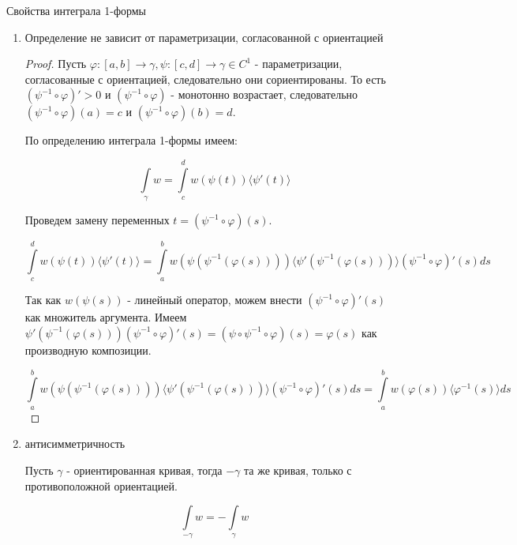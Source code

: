 \documentclass[a5paper]{article}
\theoremstyle{plain}
\theoremstyle{definition}
\numberwithin{through}{section}
\numberwithin{equation}{section}
\begin{document}
Свойства интеграла 1-формы

\begin{enumerate}
	\item Определение не зависит от параметризации, согласованной с ориентацией
	
	\begin{proof}
		Пусть $\varphi : [a, b] \to \gamma, \psi : [c, d] \to \gamma \in C^1$ - параметризации, согласованные с ориентацией, следовательно они сориентированы. То есть  $(\psi^{-1} \circ \varphi)' > 0$ и $(\psi^{-1} \circ \varphi)$ - монотонно возрастает, следовательно $(\psi^{-1} \circ \varphi)(a) = c$ и $(\psi^{-1} \circ \varphi)(b) = d$.
		
		По определению интеграла 1-формы имеем:
		
		\begin{equation*}
			\int\limits_{\gamma} w = \int\limits_{c}^{d} w(\psi(t)) \langle \psi'(t) \rangle 
		\end{equation*}
		
		Проведем замену переменных $t = (\psi^{-1} \circ \varphi)(s)$.
		
		\begin{equation*}
			\int\limits_{c}^{d} w(\psi(t)) \langle \psi'(t) \rangle = \int\limits_{a}^{b} w(\psi(\psi^{-1}(\varphi(s)))) \langle \psi'(\psi^{-1}(\varphi(s))) \rangle (\psi^{-1} \circ \varphi)'(s) ds
		\end{equation*}
		
		Так как $w(\psi(s))$ - линейный оператор, можем внести $(\psi^{-1} \circ \varphi)'(s)$ как множитель аргумента. Имеем $\psi'(\psi^{-1}(\varphi(s)))(\psi^{-1} \circ \varphi)'(s) = (\psi \circ \psi^{-1} \circ \varphi)(s)= \varphi(s)$ как производную композиции.
		
		\begin{equation*}
			 \int\limits_{a}^{b} w(\psi(\psi^{-1}(\varphi(s)))) \langle \psi'(\psi^{-1}(\varphi(s))) \rangle (\psi^{-1} \circ \varphi)'(s) ds = \int\limits_{a}^{b} w(\varphi(s)) \langle \varphi^{-1}(s) \rangle ds
		\end{equation*} 
	\end{proof}

	\item антисимметричность
	
	Пусть $\gamma$ - ориентированная кривая, тогда $-\gamma$ та же кривая, только с противоположной ориентацией. 
	
	\begin{equation*}
		\int\limits_{-\gamma} w = -\int\limits_{\gamma} w
	\end{equation*}
	

\end{enumerate}
\end{document}

